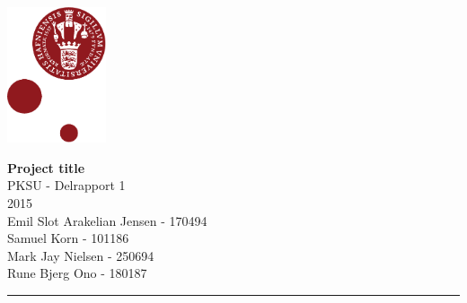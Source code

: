\documentclass[12pt]{article}
\begin{document}
\begin{minipage}[b]{1.0\linewidth} 
\includegraphics[height=40mm]{KULogo}

\vspace*{-30ex}
\begin{center}
    {\Large \bf Project title} \vspace*{1ex} \\
    {\large PKSU - Delrapport 1} \vspace*{1ex} \\
    {\large 2015} \vspace*{1ex} \\
    {\large Emil Slot Arakelian Jensen - 170494} \vspace*{1ex}\\
    {\large Samuel Korn - 101186} \vspace*{1ex}\\
    {\large Mark Jay Nielsen - 250694} \vspace*{1ex}\\
    {\large Rune Bjerg Ono - 180187} \vspace*{1ex}\\
\end{center}

\vspace*{-3pt}
{\color{KU-red}\hrule}
\end{minipage}

\newpage
\tableofcontents

\newpage
\end{document}
